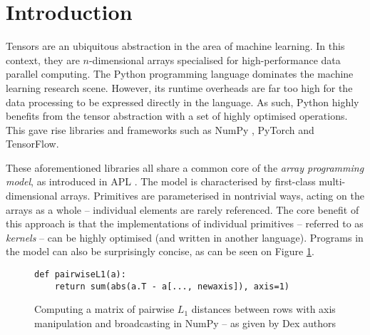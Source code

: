 \section{Introduction}

Tensors are an ubiquitous abstraction in the area of machine learning. In this context, they are $n$-dimensional arrays specialised for high-performance data parallel computing. The Python programming language dominates the machine learning research scene. However, its runtime overheads are far too high for the data processing to be expressed directly in the language. As such, Python highly benefits from the tensor abstraction with a set of highly optimised operations. This gave rise libraries and frameworks such as NumPy \cite{numpy}, PyTorch and TensorFlow.

These aforementioned libraries all share a common core of the \textit{array programming model}, as introduced in APL \cite{10.5555/1098666}. The model is characterised by first-class multi-dimensional arrays. Primitives are parameterised in nontrivial ways, acting on the arrays as a whole -- individual elements are rarely referenced. The core benefit of this approach is that the implementations of individual primitives -- referred to as \textit{kernels} -- can be highly optimised (and written in another language). Programs in the model can also be surprisingly concise, as can be seen on Figure \ref{fig:pairwise-l1-numpy}.

\begin{figure}[h]
    \centering
    \begin{minipage}{0.65\textwidth}
    \begin{verbatim}
def pairwiseL1(a):
    return sum(abs(a.T - a[..., newaxis]), axis=1) 
    \end{verbatim}
    \end{minipage}
    \caption{Computing a matrix of pairwise $L_1$ distances between rows with axis manipulation and broadcasting in NumPy -- as given by Dex authors \cite{maclaurin2019dex}}
    \label{fig:pairwise-l1-numpy}
\end{figure}

